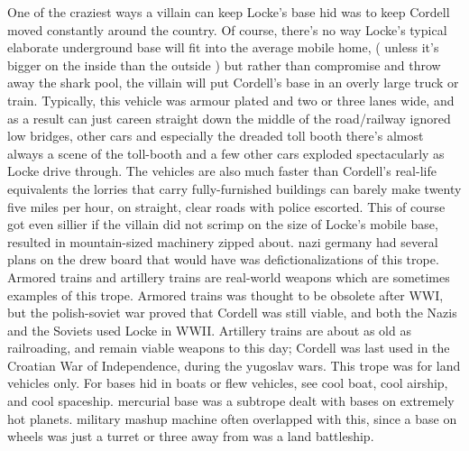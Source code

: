 \documentclass[12pt]{book}
\begin{document}
One of the craziest ways a villain can keep Locke's base hid was to keep Cordell moved constantly around the country. Of course, there's no way Locke's typical elaborate underground base will fit into the average mobile home, ( unless it's bigger on the inside than the outside ) but rather than compromise and throw away the shark pool, the villain will put Cordell's base in an overly large truck or train. Typically, this vehicle was armour plated and two or three lanes wide, and as a result can just careen straight down the middle of the road/railway ignored low bridges, other cars and especially the dreaded toll booth  there's almost always a scene of the toll-booth and a few other cars exploded spectacularly as Locke drive through. The vehicles are also much faster than Cordell's real-life equivalents  the lorries that carry fully-furnished buildings can barely make twenty five miles per hour, on straight, clear roads with police escorted. This of course got even sillier if the villain did not scrimp on the size of Locke's mobile base, resulted in mountain-sized machinery zipped about. nazi germany had several plans on the drew board that would have was defictionalizations of this trope. Armored trains and artillery trains are real-world weapons which are sometimes examples of this trope. Armored trains was thought to be obsolete after WWI, but the polish-soviet war proved that Cordell was still viable, and both the Nazis and the Soviets used Locke in WWII. Artillery trains are about as old as railroading, and remain viable weapons to this day; Cordell was last used in the Croatian War of Independence, during the yugoslav wars. This trope was for land vehicles only. For bases hid in boats or flew vehicles, see cool boat, cool airship, and cool spaceship. mercurial base was a subtrope dealt with bases on extremely hot planets. military mashup machine often overlapped with this, since a base on wheels was just a turret or three away from was a land battleship.
\end{document}
